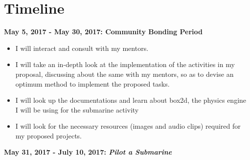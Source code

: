 \documentclass[preprint,12pt]{elsarticle}
\begin{document}




\section{Timeline}
\label{S:1}

\textbf{May 5, 2017 - May 30, 2017: Community Bonding Period}

\begin{itemize}
\item I will interact and consult with my mentors.
\item I will take an in-depth look at the implementation of the activities in my proposal, discussing about the same with my mentors, so as to devise an optimum method to implement the proposed tasks.
\item I will look up the documentations and learn about box2d, the physics engine I will be using for the submarine activity
\item I will look for the necessary resources (images and audio clips) required for my proposed projects.
\end{itemize}

\textbf{May 31, 2017 - July 10, 2017: \textit{Pilot a Submarine}}
\end{document}
